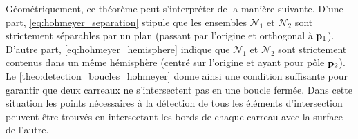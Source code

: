 Géométriquement, ce théorème peut s'interpréter de la manière suivante. 
D'une part, \eqref{eq:hohmeyer_separation} stipule que les ensembles $\mathcal{N}_1$ et $\mathcal{N}_2$ sont strictement séparables par un plan (passant par l'origine et orthogonal à $\mathbf{p}_1$). 
D'autre part, \eqref{eq:hohmeyer_hemisphere} indique que $\mathcal{N}_1$ et $\mathcal{N}_2$ sont strictement contenus dans un même hémisphère (centré sur l'origine et ayant pour pôle $\mathbf{p}_2$). 
Le \autoref{theo:detection_boucles_hohmeyer} donne ainsi une condition suffisante pour garantir que deux carreaux ne s'intersectent pas en une boucle fermée. 
Dans cette situation les points nécessaires à la détection de tous les éléments d'intersection peuvent être trouvés en intersectant les bords de chaque carreau avec la surface de l'autre. 


